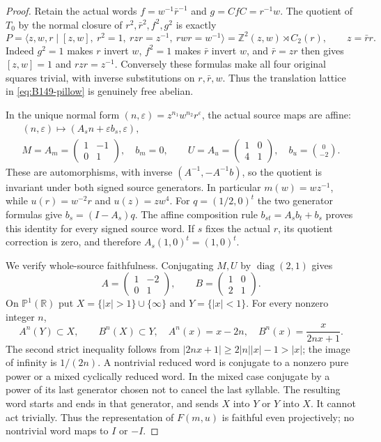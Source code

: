 \begin{proof}
Retain the actual words $f=w^{-1}\bar r^{-1}$ and $g=CfC=r^{-1}w$.
The quotient of $T_0$ by the normal closure of
$r^2,\bar r^2,f^2,g^2$ is exactly
\begin{equation}\label{eq:B149-pillow}
 P=\langle z,w,r\mid[z,w],\ r^2=1,\ rzr=z^{-1},\ rwr=w^{-1}\rangle
   =\mathbb Z^2(z,w)\rtimes C_2(r),\qquad z=\bar r r.
\end{equation}
Indeed $g^2=1$ makes $r$ invert $w$, $f^2=1$ makes $\bar r$ invert
$w$, and $\bar r=zr$ then gives $[z,w]=1$ and $rzr=z^{-1}$.
Conversely these formulas make all four original squares trivial,
with inverse substitutions on $r,\bar r,w$. Thus the translation
lattice in \eqref{eq:B149-pillow} is genuinely free abelian.

In the unique normal form $(n,\varepsilon)=z^{n_1}w^{n_2}r^\varepsilon$,
the actual source maps are affine:
\begin{equation}\label{eq:B149-matrices}
\begin{gathered}
 (n,\varepsilon)\longmapsto(A_sn+\varepsilon b_s,\varepsilon),\\
 M=A_m=\begin{pmatrix}1&-1\\0&1\end{pmatrix},\quad b_m=0,
 \qquad U=A_u=\begin{pmatrix}1&0\\4&1\end{pmatrix},\quad
 b_u=\binom{0}{-2}.
\end{gathered}
\end{equation}
These are automorphisms, with inverse $(A^{-1},-A^{-1}b)$, so the
quotient is invariant under both signed source generators. In
particular $m(w)=wz^{-1}$, while $u(r)=w^{-2}r$ and $u(z)=zw^4$.
For $q=(1/2,0)^t$ the two generator formulas give
$b_s=(I-A_s)q$. The affine composition rule
$b_{st}=A_sb_t+b_s$ proves this identity for every signed source
word. If $s$ fixes the actual $r$, its quotient correction is zero,
and therefore $A_s(1,0)^t=(1,0)^t$.

We verify whole-source faithfulness. Conjugating $M,U$ by
$\operatorname{diag}(2,1)$ gives
\[
 A=\begin{pmatrix}1&-2\\0&1\end{pmatrix},\qquad
 B=\begin{pmatrix}1&0\\2&1\end{pmatrix}.
\]
On $\mathbb P^1(\mathbb R)$ put
$X=\{|x|>1\}\cup\{\infty\}$ and $Y=\{|x|<1\}$.
For every nonzero integer $n$,
\[
 A^n(Y)\subset X,\qquad B^n(X)\subset Y,
 \quad A^n(x)=x-2n,\quad B^n(x)=\frac{x}{2nx+1}.
\]
The second strict inequality follows from
$|2nx+1|\ge2|n||x|-1>|x|$; the image of infinity is $1/(2n)$.
A nontrivial reduced word is conjugate to a nonzero pure power or
a mixed cyclically reduced word. In the mixed case conjugate by a
power of its last generator chosen not to cancel the last syllable.
The resulting word starts and ends in that generator, and sends
$X$ into $Y$ or $Y$ into $X$. It cannot act trivially. Thus the
representation of $F(m,u)$ is faithful even projectively; no
nontrivial word maps to $I$ or $-I$.


\end{proof}
